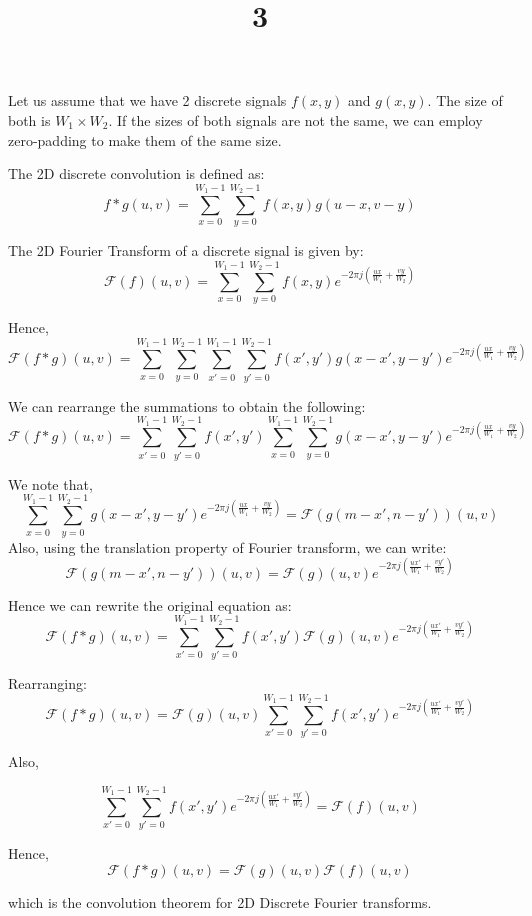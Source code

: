 \documentclass[a4paper]{article}
\title{3}
\date{}
\begin{document}
\maketitle




Let us assume that we have 2 discrete signals $f(x,y)$ and $g(x,y)$. The size of both is $W_1 \times W_2$. If the sizes of both signals are not the same, we can employ zero-padding to make them of the same size.

The 2D discrete convolution is defined as:
\[f \ast g(u,v) = \sum_{x = 0}^{W_1 -1} \sum_{y = 0}^{W_2 - 1}f(x,y)g(u-x,v-y)\]

The 2D Fourier Transform of a discrete signal is given by:
\[\mathscr{F}(f)(u,v) = \sum_{x = 0}^{W_1 -1} \sum_{y = 0}^{W_2 - 1}f(x,y)e^{-2 \pi j(\frac{ux}{W_1} + \frac{vy}{W_2})}\]

Hence,
\[\mathscr{F}(f\ast g)(u,v) = \sum_{x = 0}^{W_1 -1} \sum_{y = 0}^{W_2 - 1}\sum_{x' = 0}^{W_1 -1} \sum_{y' = 0}^{W_2 - 1}f(x',y')g(x-x',y-y')e^{-2 \pi j(\frac{ux}{W_1} + \frac{vy}{W_2})}\]

We can rearrange the summations to obtain the following:
\[\mathscr{F}(f\ast g)(u,v) = \sum_{x' = 0}^{W_1 -1} \sum_{y' = 0}^{W_2 - 1}f(x',y')\sum_{x = 0}^{W_1 -1} \sum_{y = 0}^{W_2 - 1}g(x-x',y-y')e^{-2 \pi j(\frac{ux}{W_1} + \frac{vy}{W_2})}\]

We note that,
\[\sum_{x = 0}^{W_1 -1} \sum_{y = 0}^{W_2 - 1}g(x-x',y-y')e^{-2 \pi j(\frac{ux}{W_1} + \frac{vy}{W_2})} = \mathscr{F}(g(m-x',n-y'))(u,v)\] 
Also, using the translation property of Fourier transform, we can write:
\[\mathscr{F}(g(m-x',n-y'))(u,v) = \mathscr{F}(g)(u,v)e^{-2 \pi j(\frac{ux'}{W_1} + \frac{vy'}{W_2})} \] 

Hence we can rewrite the original equation as:
\[\mathscr{F}(f\ast g)(u,v) = \sum_{x' = 0}^{W_1 -1} \sum_{y' = 0}^{W_2 - 1}f(x',y') \mathscr{F}(g)(u,v)e^{-2 \pi j(\frac{ux'}{W_1} + \frac{vy'}{W_2})}\]

Rearranging:
\[\mathscr{F}(f\ast g)(u,v) =  \mathscr{F}(g)(u,v)\sum_{x' = 0}^{W_1 -1} \sum_{y' = 0}^{W_2 - 1}f(x',y')e^{-2 \pi j(\frac{ux'}{W_1} + \frac{vy'}{W_2})}\]

Also,

\[\sum_{x' = 0}^{W_1 -1} \sum_{y' = 0}^{W_2 - 1}f(x',y')e^{-2 \pi j(\frac{ux'}{W_1} + \frac{vy'}{W_2})} = \mathscr{F}(f)(u,v)\]

Hence,
\[\mathscr{F}(f\ast g)(u,v) =  \mathscr{F}(g)(u,v)\mathscr{F}(f)(u,v)\]

which is the convolution theorem for 2D Discrete Fourier transforms.
\end{document}
